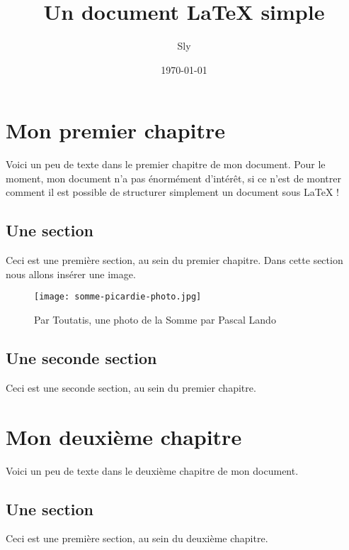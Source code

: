 \documentclass[12pt]{report}			%
\title{Un document LaTeX simple}
\author{Sly}
\date{\today}
\begin{document}
	\maketitle
	\tableofcontents	%
	
	
	\chapter{Mon premier chapitre}
	Voici un peu de texte dans le premier chapitre de mon document. Pour le moment, mon document n'a pas énormément d'intérêt, si ce n'est de montrer comment il est possible de structurer simplement un document sous LaTeX !
	\section{Une section}
	Ceci est une première section, au sein du premier chapitre. Dans cette section nous allons insérer une image.
	
	\begin{figure} %
		\centering
		\texttt{[image: somme-picardie-photo.jpg]} %
		\caption{Par Toutatis, une photo de la Somme par Pascal Lando}
		\label{fig:toutatis}
	\end{figure}
	
	\section{Une seconde section}
	Ceci est une seconde section, au sein du premier chapitre.
	
	
	
	\chapter{Mon deuxième chapitre}
	Voici un peu de texte dans le deuxième chapitre de mon document.
	\section{Une section}
	Ceci est une première section, au sein du deuxième chapitre.
	
\end{document}

